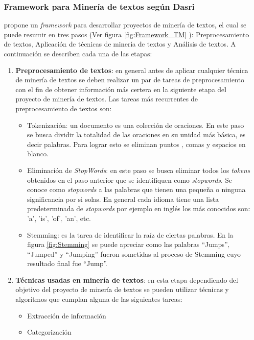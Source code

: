 \subsubsection{Framework para Minería de textos según Dasri}
    \cite{dasritext} propone un \textit{framework} para desarrollar proyectos de minería de textos, el cual se puede resumir en tres pasos (Ver figura \ref{fig:Framework_TM} ): Preprocesamiento de textos, Aplicación de técnicas de minería de textos y Análisis de textos. A continuación se describen cada una de las etapas:
    \begin{enumerate}
        \item \textbf{Preprocesamiento de textos}: en general antes de aplicar cualquier técnica de minería de textos se deben realizar un par de tareas de preprocesamiento con el fin de obtener información más certera en la siguiente etapa del proyecto de minería de textos. Las tareas más recurrentes de preprocesamiento de textos son:
        \begin{itemize}
            \item Tokenización: un documento es una colección de oraciones. En este paso se busca dividir la totalidad de las oraciones en su unidad más básica, es decir palabras. Para lograr esto se eliminan puntos , comas y espacios en blanco.
            \item Eliminación de \textit{StopWords}: en este paso se busca eliminar todos los \textit{tokens} obtenidos en el paso anterior que se identifiquen como \textit{stopwords}. Se conoce como \textit{stopwords} a las palabras que tienen una pequeña o ninguna significancia por si solas. En general cada idioma tiene una lista predeterminada de \textit{stopwords} por ejemplo en inglés los más conocidos son: 'a’, 'is’, 'of’, 'an’, etc.
            \item Stemming: es la tarea de identificar la raíz de ciertas palabras. En la figura \ref{fig:Stemming} se puede apreciar como las palabras ``Jumps'', ``Jumped'' y ``Jumping'' fueron sometidas al proceso de Stemming cuyo resultado final fue ``Jump''.
        \end{itemize}
    \item \textbf{Técnicas usadas en minería de textos}: en esta etapa dependiendo del objetivo del proyecto de minería de textos se pueden utilizar técnicas y algoritmos que cumplan alguna de las siguientes tareas:
        \begin{itemize}
            \item Extracción de información
            \item Categorización

\end{itemize}
\end{enumerate}
